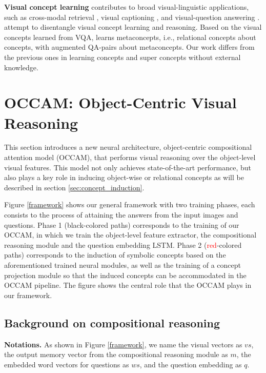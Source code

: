 \documentclass[10pt,twocolumn,letterpaper]{article}
\begin{document}
\textbf{Visual concept learning} contributes to broad visual-linguistic applications, such as cross-modal retrieval \cite{kiros2014unifying}, visual captioning \cite{karpathy2015deep}, and visual-question answering \cite{malinowski2015ask, antol2015vqa}. \cite{yi2018neural, mao2018neuro} attempt to disentangle visual concept learning and reasoning. Based on the visual concepts learned from VQA, \cite{han2019visual} learns metaconcepts, i.e., relational concepts about concepts, with augmented QA-pairs about metaconcepts. Our work differs from the previous ones in learning concepts and super concepts without external knowledge.
\vspace{-3mm}




\section{OCCAM: Object-Centric Visual Reasoning}
\vspace{-2mm}
This section introduces a new neural architecture, object-centric compositional attention model (OCCAM), that performs visual reasoning over the object-level visual features.
This model not only achieves state-of-the-art performance, but also plays a key role in inducing object-wise or relational concepts as will be described in section \ref{sec:concept_induction}.

Figure \ref{framework} shows our general framework with two training phases, each consists to the process of attaining the answers from the input images and questions.
Phase 1 (black-colored paths) corresponds to the training of our OCCAM, in which we train the object-level feature extractor, the compositional reasoning module and the question embedding LSTM. 
Phase 2 (\textcolor{red}{red}-colored paths) corresponds to the induction of symbolic concepts based on the aforementioned trained neural modules, as well as the training of a concept projection module so that the induced concepts can be accommodated in the OCCAM pipeline. 
The figure shows the central role that the OCCAM plays in our framework.







\vspace{-2mm}
\subsection{Background on compositional reasoning}
\vspace{-2mm}
\label{ssec:mac}
\textbf{Notations.} As shown in Figure \ref{framework}, we name the visual vectors as $vs$, the output memory vector from the compositional reasoning module as $m$, the embedded word vectors for questions as $ws$, and the question embedding as $q$. 
\end{document}
